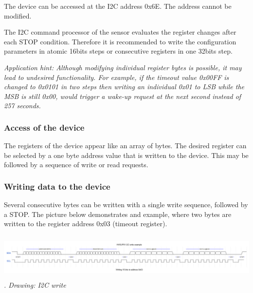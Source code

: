 \documentclass[a4paper]{article}
\newcounter{Drawing}
\renewcommand\theDrawing{\arabic{Drawing}}
\begin{document}
{
The device can be accessed at the I2C address 0x6E. The address cannot be modified. }

{
The I2C command processor of the sensor evaluates the register changes after each STOP condition. Therefore it is
recommended to write the configuration parameters in atomic 16bits steps or consecutive registers in one 32bits step.}

{
\textit{Application hint: Although modifying individual register bytes is possible, it may lead to undesired
functionality. For example, if the timeout value 0x00FF is changed to 0x0101 in two steps then writing an individual
0x01 to LSB while the MSB is still 0x00, would trigger a wake-up request at the next second instead of 257 seconds.}}

\subsubsection[Access of the device]{ Access of the device}
\hypertarget{RefHeadingToc12271084818799}{}{
The registers of the device appear like an array of bytes. The desired register can be selected by a one byte address
value that is written to the device. This may be followed by a sequence of write or read requests.}

\subsubsection[Writing data to the device]{ Writing data to the device}
\hypertarget{RefHeadingToc12291084818799}{}{
Several consecutive bytes can be written with a single write sequence, followed by a STOP. The picture below
demonstrates and example, where two bytes are written to the register address 0x03 (timeout register).}



\begin{center}
\begin{minipage}{6.9252in}
{\itshape
 \includegraphics[width=6.9252in,height=0.9102in]{HVSUP01UM-img002.png} \stepcounter{Drawing}{\theDrawing}. Drawing: I2C
write}
\end{minipage}
\end{center}
\end{document}

